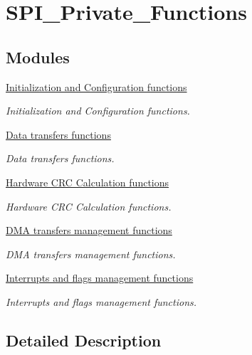 \hypertarget{group___s_p_i___private___functions}{\section{S\-P\-I\-\_\-\-Private\-\_\-\-Functions}
\label{group___s_p_i___private___functions}
}
\subsection*{Modules}
\begin{DoxyCompactItemize}
\item 
\hyperlink{group___s_p_i___group1}{Initialization and Configuration functions}
\begin{DoxyCompactList}\small\item\em Initialization and Configuration functions. \end{DoxyCompactList}\item 
\hyperlink{group___s_p_i___group2}{Data transfers functions}
\begin{DoxyCompactList}\small\item\em Data transfers functions. \end{DoxyCompactList}\item 
\hyperlink{group___s_p_i___group3}{Hardware C\-R\-C Calculation functions}
\begin{DoxyCompactList}\small\item\em Hardware C\-R\-C Calculation functions. \end{DoxyCompactList}\item 
\hyperlink{group___s_p_i___group4}{D\-M\-A transfers management functions}
\begin{DoxyCompactList}\small\item\em D\-M\-A transfers management functions. \end{DoxyCompactList}\item 
\hyperlink{group___s_p_i___group5}{Interrupts and flags management functions}
\begin{DoxyCompactList}\small\item\em Interrupts and flags management functions. \end{DoxyCompactList}\end{DoxyCompactItemize}


\subsection{Detailed Description}
